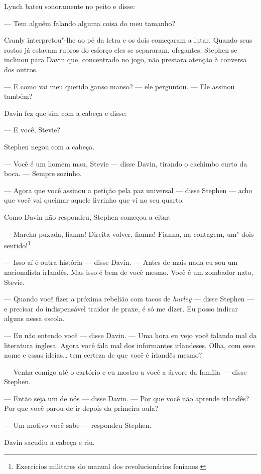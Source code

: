 Lynch bateu sonoramente no peito e disse:

 --- Tem alguém falando alguma coisa do meu tamanho?

Cranly interpretou"-lhe ao pé da letra e os dois começaram a lutar.
Quando seus rostos já estavam rubros do esforço eles se separaram,
ofegantes. Stephen se inclinou para Davin que, concentrado no jogo, não
prestara atenção à conversa dos outros.

 --- E como vai meu querido ganso manso? --- ele perguntou. --- Ele assinou também?

Davin fez que sim com a cabeça e disse:

 --- E você, Stevie?

Stephen negou com a cabeça.

 --- Você é um homem mau, Stevie --- disse Davin, tirando o cachimbo curto da
boca. --- Sempre sozinho.

 --- Agora que você assinou a petição pela paz universal --- disse Stephen --- 
acho que você vai queimar aquele livrinho que vi no seu quarto.

Como Davin não respondeu, Stephen começou a citar:

 --- Marcha puxada, fianna! Direita volver, fianna! Fianna, na contagem,
um"-dois sentido!\footnote{ Exercícios militares do manual dos
revolucionários fenianos.}

 --- Isso aí é outra história --- disse Davin. --- Antes de mais nada eu sou um
nacionalista irlandês. Mas isso é bem de você mesmo. Você é um zombador
nato, Stevie.

 --- Quando você fizer a próxima rebelião com tacos de \textit{hurley} --- 
disse Stephen --- e precisar do indispensável traidor de praxe, é só me
dizer. Eu posso indicar alguns nessa escola.

 --- Eu não entendo você --- disse Davin. --- Uma hora eu vejo você falando mal da
literatura inglesa. Agora você fala mal dos informantes irlandeses.
Olha, com esse nome e essas ideias\ldots{} tem certeza de que você é
irlandês mesmo?

 --- Venha comigo até o cartório e eu mostro a você a árvore da família --- 
disse Stephen.

 --- Então seja um de nós --- disse Davin. --- Por que você não aprende irlandês?
Por que você parou de ir depois da primeira aula?

 --- Um motivo você sabe --- respondeu Stephen.

Davin sacudiu a cabeça e riu.

